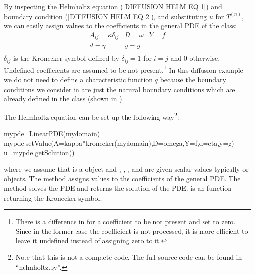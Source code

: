 By inspecting the Helmholtz equation
(\ref{DIFFUSION HELM EQ 1}) and boundary condition (\ref{DIFFUSION HELM EQ 2}),
and substituting $u$ for $T^{(n)}$, we can easily assign values to the
coefficients in the general PDE of the \LinearPDE class:
\begin{equation}\label{DIFFUSION HELM EQ 3}
\begin{array}{llllll}
A_{ij}=\kappa \delta_{ij} & D=\omega & Y=f \\
d=\eta & y= g &  \\
\end{array}
\end{equation}
$\delta_{ij}$ is the Kronecker symbol defined
by $\delta_{ij}=1$ for $i=j$ and $0$ otherwise.
Undefined coefficients are assumed to be not present.\footnote{There is a
difference in \escript for a coefficient to be not present and set to zero.
Since in the former case the coefficient is not processed, it is more efficient
to leave it undefined instead of assigning zero to it.}
In this diffusion example we do not need to define a characteristic function
$q$ because the boundary conditions we consider in 
are just the natural boundary conditions which are already defined in the
\LinearPDE class (shown in ).

The Helmholtz equation can be set up the following way\footnote{Note that this
is not a complete code. The full source code can be found in ``helmholtz.py''.}:
\begin{python}
  mypde=LinearPDE(mydomain)
  mypde.setValue(A=kappa*kronecker(mydomain),D=omega,Y=f,d=eta,y=g)
  u=mypde.getSolution()
\end{python}
where we assume that  is a \Domain object and 
, , , and  are given scalar values
typically  or \Data objects. The  method
assigns values to the coefficients of the general PDE.
The  method solves the PDE and returns the solution
 of the PDE.  is an \escript function returning
the Kronecker symbol.

